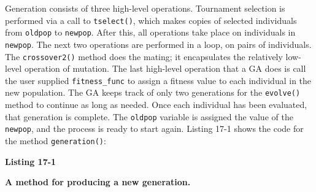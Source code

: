 
Generation consists of three high-level operations. Tournament
selection is performed via a call to \texttt{tselect()}, which makes
copies of selected individuals from \texttt{oldpop} to
\texttt{newpop}.
After this, all operations take place on individuals in
\texttt{newpop}. The next two operations are performed in a
loop, on pairs of individuals. The \texttt{crossover2()} method does
the mating; it encapsulates the relatively low-level operation of
mutation. The last high-level operation that a GA does is call the user
supplied \texttt{fitness\_func} to assign a fitness value to each
individual in the new population. The GA keeps track of only two
generations for the \texttt{evolve()} method to continue as long as
needed. Once each individual has been evaluated, that generation is
complete. The \texttt{oldpop} variable is assigned the value of the
\texttt{newpop}, and the process is ready to start again. Listing 17-1
shows the code for the method \texttt{generation()}:

\bigskip

{\sffamily\bfseries Listing 17-1}

{\sffamily\bfseries A method for producing a new generation.}

